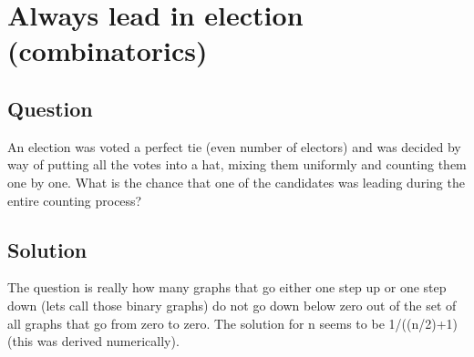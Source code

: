 \documentclass{article}
\begin{document}
\section{Always lead in election (combinatorics)}

\subsection{Question}

An election was voted a perfect tie (even number of electors) and was decided by way of putting
all the votes into a hat, mixing them uniformly and counting them one by one. What is the chance
that one of the candidates was leading during the entire counting process?

\subsection{Solution}
The question is really how many graphs that go either one step up or one step down (lets call those
binary graphs) do not go down below zero out of the set of all graphs that go from zero to zero.
The solution for n seems to be 1/((n/2)+1) (this was derived numerically).

\label{end}
\end{document}
